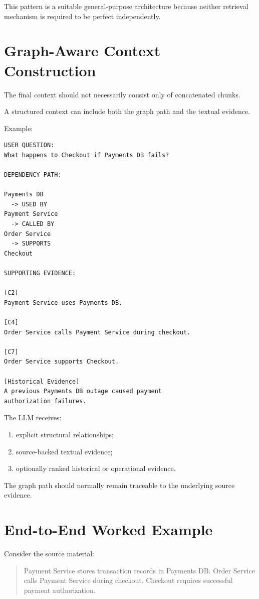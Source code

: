 \documentclass[11pt,a4paper]{article}
\begin{document}
This pattern is a suitable general-purpose architecture because neither retrieval mechanism is required to be perfect independently.

\section{Graph-Aware Context Construction}

The final context should not necessarily consist only of concatenated chunks.

A structured context can include both the graph path and the textual evidence.

Example:

\begin{lstlisting}
USER QUESTION:
What happens to Checkout if Payments DB fails?

DEPENDENCY PATH:

Payments DB
  -> USED BY
Payment Service
  -> CALLED BY
Order Service
  -> SUPPORTS
Checkout

SUPPORTING EVIDENCE:

[C2]
Payment Service uses Payments DB.

[C4]
Order Service calls Payment Service during checkout.

[C7]
Order Service supports Checkout.

[Historical Evidence]
A previous Payments DB outage caused payment
authorization failures.
\end{lstlisting}

The LLM receives:

\begin{enumerate}
\item explicit structural relationships;
\item source-backed textual evidence;
\item optionally ranked historical or operational evidence.
\end{enumerate}

The graph path should normally remain traceable to the underlying source evidence.

\section{End-to-End Worked Example}

Consider the source material:

\begin{quote}
Payment Service stores transaction records in Payments DB. Order Service calls Payment Service during checkout. Checkout requires successful payment authorization.
\end{quote}
\end{document}
